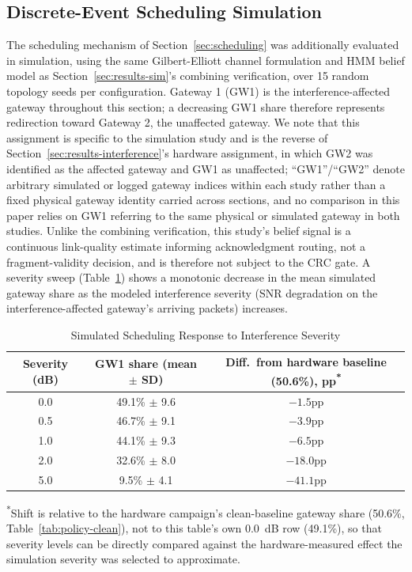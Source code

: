 \documentclass[journal]{IEEEtran}
\begin{document}
\subsection{Discrete-Event Scheduling Simulation}
\label{sec:results-sched}
The scheduling mechanism of Section~\ref{sec:scheduling} was additionally evaluated in simulation, using the same Gilbert-Elliott channel formulation and HMM belief model as Section~\ref{sec:results-sim}'s combining verification, over 15 random topology seeds per configuration. Gateway 1 (GW1) is the interference-affected gateway throughout this section; a decreasing GW1 share therefore represents redirection toward Gateway 2, the unaffected gateway. We note that this assignment is specific to the simulation study and is the reverse of Section~\ref{sec:results-interference}'s hardware assignment, in which GW2 was identified as the affected gateway and GW1 as unaffected; ``GW1''/``GW2'' denote arbitrary simulated or logged gateway indices within each study rather than a fixed physical gateway identity carried across sections, and no comparison in this paper relies on GW1 referring to the same physical or simulated gateway in both studies. Unlike the combining verification, this study's belief signal is a continuous link-quality estimate informing acknowledgment routing, not a fragment-validity decision, and is therefore not subject to the CRC gate. A severity sweep (Table~\ref{tab:sim-severity}) shows a monotonic decrease in the mean simulated gateway share as the modeled interference severity (SNR degradation on the interference-affected gateway's arriving packets) increases.

\begin{table}[t]
\caption{Simulated Scheduling Response to Interference Severity}
\label{tab:sim-severity}
\centering
\begin{tabular}{@{}ccc@{}}
\toprule
Severity (dB) & GW1 share (mean $\pm$ SD) & Diff.\ from hardware baseline (50.6\%), pp\textsuperscript{*} \\
\midrule
0.0 & 49.1\% $\pm$ 9.6 & $-1.5$pp \\
0.5 & 46.7\% $\pm$ 9.1 & $-3.9$pp \\
1.0 & 44.1\% $\pm$ 9.3 & $-6.5$pp \\
2.0 & 32.6\% $\pm$ 8.0 & $-18.0$pp \\
5.0 & 9.5\% $\pm$ 4.1 & $-41.1$pp \\
\bottomrule
\end{tabular}

\noindent\textsuperscript{*}Shift is relative to the hardware campaign's clean-baseline gateway share (50.6\%, Table~\ref{tab:policy-clean}), not to this table's own 0.0~dB row (49.1\%), so that severity levels can be directly compared against the hardware-measured effect the simulation severity was selected to approximate.
\end{table}
\end{document}
